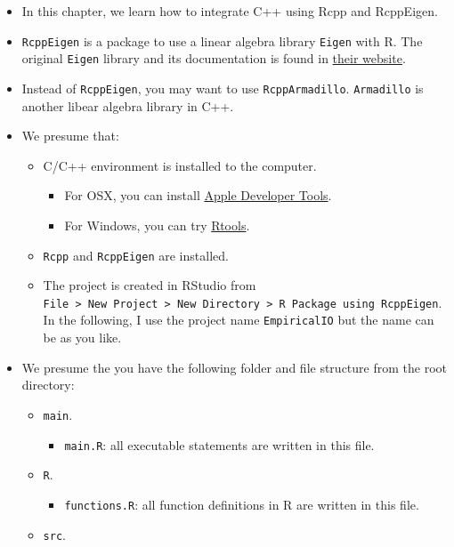 \documentclass[
]{book}
\providecommand{\tightlist}{%
  \setlength{\itemsep}{0pt}\setlength{\parskip}{0pt}}
\begin{document}
\begin{itemize}
\tightlist
\item
  In this chapter, we learn how to integrate C++ using Rcpp and RcppEigen.
\item
  \texttt{RcppEigen} is a package to use a linear algebra library \texttt{Eigen} with R. The original \texttt{Eigen} library and its documentation is found in \href{http://eigen.tuxfamily.org/index.php?title=Main_Page}{their website}.
\item
  Instead of \texttt{RcppEigen}, you may want to use \texttt{RcppArmadillo}. \texttt{Armadillo} is another libear algebra library in C++.
\item
  We presume that:

  \begin{itemize}
  \tightlist
  \item
    C/C++ environment is installed to the computer.

    \begin{itemize}
    \tightlist
    \item
      For OSX, you can install \href{https://developer.apple.com/xcode/}{Apple Developer Tools}.
    \item
      For Windows, you can try \href{https://cran.r-project.org/bin/windows/Rtools/}{Rtools}.
    \end{itemize}
  \item
    \texttt{Rcpp} and \texttt{RcppEigen} are installed.
  \item
    The project is created in RStudio from \texttt{File\ \textgreater{}\ New\ Project\ \textgreater{}\ New\ Directory\ \textgreater{}\ R\ Package\ using\ RcppEigen}. In the following, I use the project name \texttt{EmpiricalIO} but the name can be as you like.
  \end{itemize}
\item
  We presume the you have the following folder and file structure from the root directory:

  \begin{itemize}
  \tightlist
  \item
    \texttt{main}.

    \begin{itemize}
    \tightlist
    \item
      \texttt{main.R}: all executable statements are written in this file.
    \end{itemize}
  \item
    \texttt{R}.

    \begin{itemize}
    \tightlist
    \item
      \texttt{functions.R}: all function definitions in R are written in this file.
    \end{itemize}
  \item
    \texttt{src}.


\end{itemize}
\end{itemize}
\end{document}
